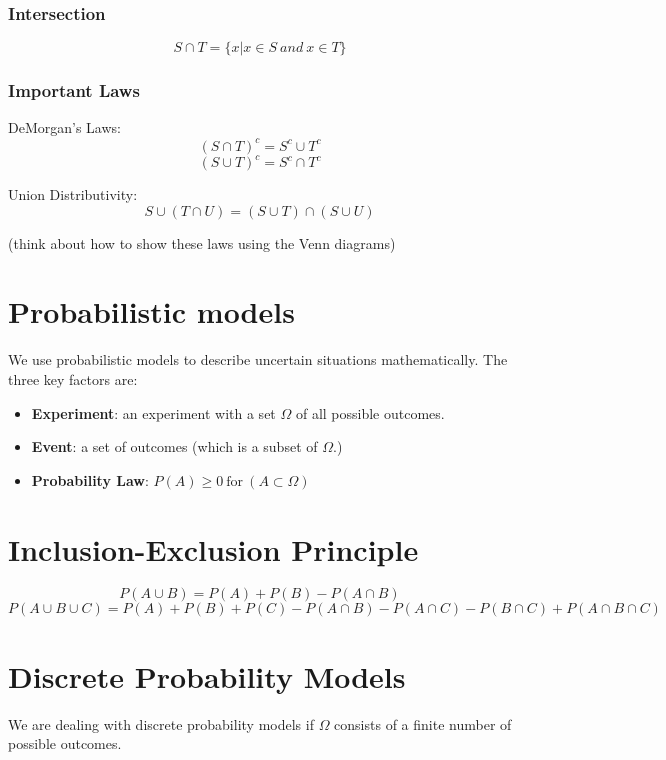 \documentclass[11pt]{article}
\begin{document}
\subsubsection{Intersection}
$$ S \cap T =  \{ x | x \in S \: and \: x \in T\}$$

\subsubsection{Important Laws}
DeMorgan's Laws:
$$(S \cap T)^{c} = S^{c} \cup T^{c}$$
$$(S \cup T)^{c} = S^{c} \cap T^{c}$$

\noindent Union Distributivity:
$$S \cup (T \cap U) = (S \cup T) \cap (S \cup U) $$

\noindent (think about how to show these laws using the Venn diagrams)

\section{Probabilistic models}
We use probabilistic models to describe uncertain situations mathematically. The three key factors are:
\begin{itemize}
  \item \textbf{Experiment}: an experiment with a set $\Omega$ of all possible outcomes.
  \item \textbf{Event}: a set of outcomes (which is a subset of $\Omega$.)
  \item \textbf{Probability Law}: $P(A) \geq 0 \: \text{for} \: ( A \subset \Omega)$
\end{itemize}

\section{Inclusion-Exclusion Principle}
$$P(A \cup B) = P(A) + P(B) - P(A \cap B)$$
$$P(A \cup B \cup C) = P(A) + P(B) + P(C) - P(A \cap B) - P(A \cap C) - P(B \cap C) + P(A \cap B \cap C)$$

\section{Discrete Probability Models}
We are dealing with discrete probability models if $\Omega$ consists of a finite number of possible outcomes.
\end{document}
